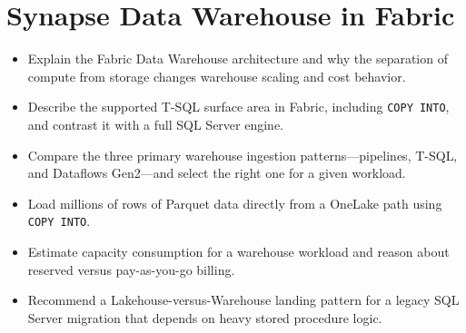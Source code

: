 \chapter{Synapse Data Warehouse in Fabric}
%

\begin{objectives}
\begin{itemize}
    \item Explain the Fabric Data Warehouse architecture and why the separation of compute from storage changes warehouse scaling and cost behavior.
    \item Describe the supported T-SQL surface area in Fabric, including \texttt{COPY INTO}, and contrast it with a full SQL Server engine.
    \item Compare the three primary warehouse ingestion patterns---pipelines, T-SQL, and Dataflows Gen2---and select the right one for a given workload.
    \item Load millions of rows of Parquet data directly from a OneLake path using \texttt{COPY INTO}.
    \item Estimate capacity consumption for a warehouse workload and reason about reserved versus pay-as-you-go billing.
    \item Recommend a Lakehouse-versus-Warehouse landing pattern for a legacy SQL Server migration that depends on heavy stored procedure logic.
\end{itemize}
\end{objectives}

